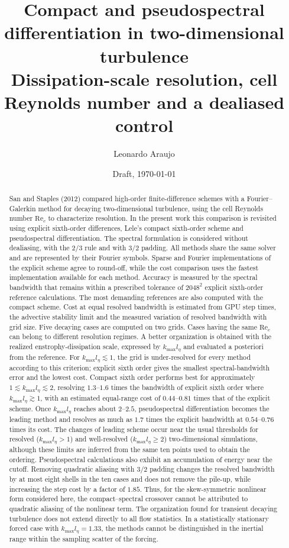 \documentclass[11pt,a4paper]{article}
\title{Compact and pseudospectral differentiation in two-dimensional turbulence\\
\large Dissipation-scale resolution, cell Reynolds number and a dealiased control}
\author{Leonardo Araujo}
\date{Draft, \today}
\newcommand{\Rey}{\mathrm{Re}}
\begin{document}
\maketitle
\begin{abstract}
San and Staples (2012) compared high-order finite-difference schemes with a Fourier--Galerkin method for decaying two-dimensional turbulence, using the cell Reynolds number $\Rey_c$ to characterize resolution. In the present work this comparison is revisited using explicit sixth-order differences, Lele's compact sixth-order scheme and pseudospectral differentiation. The spectral formulation is considered without dealiasing, with the 2/3 rule and with $3/2$ padding. All methods share the same solver and are represented by their Fourier symbols. Sparse and Fourier implementations of the explicit scheme agree to round-off, while the cost comparison uses the fastest implementation available for each method. Accuracy is measured by the spectral bandwidth that remains within a prescribed tolerance of $2048^2$ explicit sixth-order reference calculations. The most demanding references are also computed with the compact scheme. Cost at equal resolved bandwidth is estimated from GPU step times, the advective stability limit and the measured variation of resolved bandwidth with grid size.
Five decaying cases are computed on two grids. Cases having the same $\Rey_c$ can belong to different resolution regimes. A better organization is obtained with the realized enstrophy-dissipation scale, expressed by $k_{\max}l_\eta$ and evaluated a posteriori from the reference. For $k_{\max}l_\eta\lesssim1$, the grid is under-resolved for every method according to this criterion; explicit sixth order gives the smallest spectral-bandwidth error and the lowest cost. Compact sixth order performs best for approximately $1\lesssim k_{\max}l_\eta\lesssim2$, resolving $1.3$--$1.6$ times the bandwidth of explicit sixth order where $k_{\max}l_\eta\gtrsim1$, with an estimated equal-range cost of $0.44$--$0.81$ times that of the explicit scheme. Once $k_{\max}l_\eta$ reaches about $2$--$2.5$, pseudospectral differentiation becomes the leading method and resolves as much as $1.7$ times the explicit bandwidth at $0.54$--$0.76$ times its cost.
The changes of leading scheme occur near the usual thresholds for resolved ($k_{\max}l_\eta>1$) and well-resolved ($k_{\max}l_\eta\ge2$) two-dimensional simulations, although these limits are inferred from the same ten points used to obtain the ordering. Pseudospectral calculations also exhibit an accumulation of energy near the cutoff. Removing quadratic aliasing with $3/2$ padding changes the resolved bandwidth by at most eight shells in the ten cases and does not remove the pile-up, while increasing the step cost by a factor of $1.85$. Thus, for the skew-symmetric nonlinear form considered here, the compact--spectral crossover cannot be attributed to quadratic aliasing of the nonlinear term. The organization found for transient decaying turbulence does not extend directly to all flow statistics. In a statistically stationary forced case with $k_{\max}l_\eta=1.33$, the methods cannot be distinguished in the inertial range within the sampling scatter of the forcing.
\end{abstract}
\end{document}
